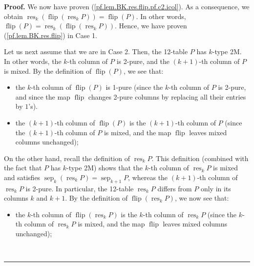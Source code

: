 \documentclass[numbers=enddot,12pt,final,onecolumn,notitlepage]{scrartcl}%
\theoremstyle{definition}
\newenvironment{proof}[1][Proof]{\noindent\textbf{#1.} }{\ \rule{0.5em}{0.5em}}
\begin{document}
\begin{proof}
We now have proven (\ref{pf.lem.BK.res.flip.pf.c2.icol}). As a consequence, we
obtain $\operatorname*{res}\nolimits_{k}\left(  \operatorname*{flip}\left(
\operatorname*{res}\nolimits_{k}P\right)  \right)  =\operatorname*{flip}%
\left(  P\right)  $. In other words, $\operatorname*{flip}\left(  P\right)
=\operatorname*{res}\nolimits_{k}\left(  \operatorname*{flip}\left(
\operatorname*{res}\nolimits_{k}P\right)  \right)  $. Hence, we have proven
(\ref{pf.lem.BK.res.flip}) in Case 1.

Let us next assume that we are in Case 2. Then, the 12-table $P$ has $k$-type
2M. In other words, the $k$-th column of $P$ is 2-pure, and the $\left(
k+1\right)  $-th column of $P$ is mixed. By the definition of
$\operatorname*{flip}\left(  P\right)  $, we see that:

\begin{itemize}
\item the $k$-th column of $\operatorname*{flip}\left(  P\right)  $ is 1-pure
(since the $k$-th column of $P$ is 2-pure, and since the map
$\operatorname*{flip}$ changes 2-pure columns by replacing all their entries
by $1$'s).

\item the $\left(  k+1\right)  $-th column of $\operatorname*{flip}\left(
P\right)  $ is the $\left(  k+1\right)  $-th column of $P$ (since the $\left(
k+1\right)  $-th column of $P$ is mixed, and the map $\operatorname*{flip}$
leaves mixed columns unchanged);
\end{itemize}

On the other hand, recall the definition of $\operatorname*{res}%
\nolimits_{k}P$. This definition (combined with the fact that $P$ has $k$-type
2M) shows that the $k$-th column of $\operatorname*{res}_{k}P$ is mixed and
satisfies $\operatorname*{sep}\nolimits_{k}\left(  \operatorname*{res}%
\nolimits_{k}P\right)  =\operatorname*{sep}\nolimits_{k+1}P$, whereas the
$\left(  k+1\right)  $-th column of $\operatorname*{res}\nolimits_{k}P$ is
2-pure. In particular, the 12-table $\operatorname*{res}\nolimits_{k}P$
differs from $P$ only in its columns $k$ and $k+1$. By the definition of
$\operatorname*{flip}\left(  \operatorname*{res}\nolimits_{k}P\right)  $, we
now see that:

\begin{itemize}
\item the $k$-th column of $\operatorname*{flip}\left(  \operatorname*{res}%
\nolimits_{k}P\right)  $ is the $k$-th column of $\operatorname*{res}%
\nolimits_{k}P$ (since the $k$-th column of $\operatorname*{res}%
\nolimits_{k}P$ is mixed, and the map $\operatorname*{flip}$ leaves mixed
columns unchanged);


\end{itemize}
\end{proof}
\end{document}
